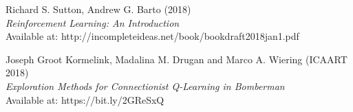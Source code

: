 \documentclass[12pt]{report}
\begin{document}
\begin{thebibliography}{111}
   



Richard S. Sutton, Andrew G. Barto (2018)\\
\textit{Reinforcement Learning: An Introduction}\\
Available at: http://incompleteideas.net/book/bookdraft2018jan1.pdf

Joseph Groot Kormelink, Madalina M. Drugan and Marco A. Wiering (ICAART 2018)\\
\textit{Exploration Methods for Connectionist Q-Learning in Bomberman}\\
Available at: https://bit.ly/2GReSxQ
\end{thebibliography}
\end{document}
